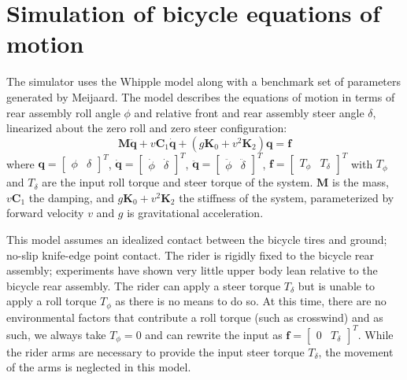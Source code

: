 \documentclass[11pt,a4paper,reqno]{amsart}
\newcommand{\damping}{v \bm{C}_1}
\newcommand{\stiffness}{g \bm{K}_0 + v^2 \bm{K}_2}
\begin{document}
\section{Simulation of bicycle equations of motion}
The simulator uses the Whipple model\cite{whipple1899} along with a benchmark set of parameters generated by
Meijaard\cite{meijaard2007}.
The model describes the equations of motion in terms of rear assembly roll angle $\phi$ and relative front and rear
assembly steer angle $\delta$, linearized about the zero roll and zero steer configuration:
\begin{equation}
    \bm{M \ddot{q}} + \damping \dot{\bm{q}} + (\stiffness) \bm{q} = \bm{f} \label{eq:eom}
\end{equation}
where
$ \bm{q} = \begin{bmatrix} \phi & \delta \end{bmatrix}^T $,
$ \dot{\bm{q}} = \begin{bmatrix} \dot{\phi} & \dot{\delta} \end{bmatrix}^T $,
$ \ddot{\bm{q}} = \begin{bmatrix} \ddot{\phi} & \ddot{\delta} \end{bmatrix}^T $,
$ \bm{f} = \begin{bmatrix} T_\phi & T_\delta \end{bmatrix}^T $ with $ T_\phi $ and $ T_\delta $ are the input roll
torque and steer torque of the system.
$ \bm{M} $ is the mass, $ \damping $ the damping, and $ \stiffness $ the stiffness of the system,
parameterized by forward velocity $ v $ and $ g $ is gravitational acceleration.

This model assumes an idealized contact between the bicycle tires and ground; no-slip knife-edge point contact.
The rider is rigidly fixed to the bicycle rear assembly; experiments have shown very little upper body lean relative to
the bicycle rear assembly\cite{kooijman2009}.
The rider can apply a steer torque $ T_\delta $ but is unable to apply a roll torque $ T_\phi $ as there is no means to
do so. At this time, there are no environmental factors that contribute a roll torque (such as crosswind) and as such,
we always take $ T_\phi = 0 $ and can rewrite the input as $ \bm{f} = \begin{bmatrix} 0  & T_\delta \end{bmatrix}^T $.
While the rider arms are necessary to provide the input steer torque $ T_\delta $, the movement of the arms is
neglected in this model.
\end{document}
